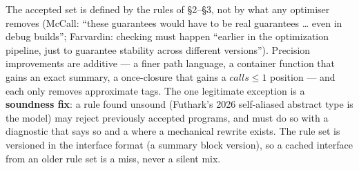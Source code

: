 The accepted set is defined by the rules of §2–§3, not by what any optimiser removes (McCall: “these guarantees would have to be real guarantees … even in debug builds”; Farvardin: checking must happen “earlier in the optimization pipeline, just to guarantee stability across different versions”). Precision improvements are additive — a finer path language, a container function that gains an exact summary, a once-closure that gains a $\mathit{calls}\le 1$ position — and each only removes approximate tags. The one legitimate exception is a \textbf{soundness fix}: a rule found unsound (Futhark's 2026 self-aliased abstract type is the model) may reject previously accepted programs, and must do so with a diagnostic that says so and a  where a mechanical rewrite exists. The rule set is versioned in the interface format (a summary block version), so a cached interface from an older rule set is a miss, never a silent mix.
